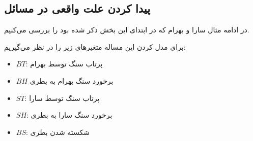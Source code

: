 \documentclass[
msc,
irfonts
]{./tex/tehran-thesis}
\newcommand{\پ}{پروژه/پایان‌نامه/رساله }
\theoremstyle{definition}
\theoremstyle{theorem}
\theoremstyle{definition}
\numberwithin{algorithm}{chapter}
\begin{document}
\subsection{پیدا کردن علت واقعی در مسائل}

در ادامه مثال سارا و بهرام که در ابتدای این بخش ذکر شده بود را بررسی می‌کنیم.

برای مدل کردن این مساله متغیر‌های زیر را در نظر می‌گیریم:
\begin{itemize}
      \item $BT$:
            پرتاب سنگ توسط بهرام
      \item $BH$
            برخورد سنگ بهرام به بطری
      \item $ST$:
            پرتاب سنگ توسط سارا
      \item $SH$:
            برخورد سنگ سارا به بطری
      \item $BS$:
            شکسته شدن بطری
\end{itemize}
\end{document}
